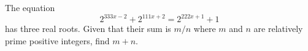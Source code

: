 The equation \[2^{333x-2}+2^{111x+2}=2^{222x+1}+1\]has three real roots. Given that their sum is $m/n$ where $m$ and $n$ are relatively prime positive integers, find $m+n$.